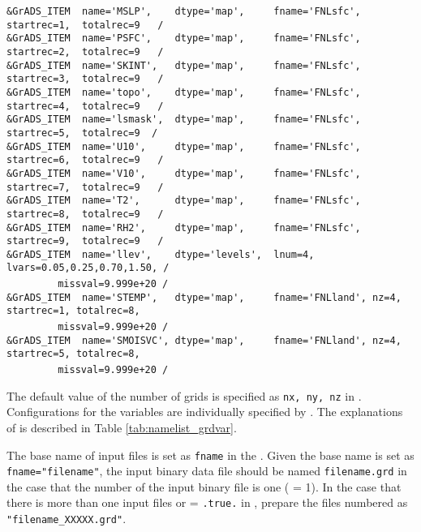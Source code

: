 {\verb|&GrADS_ITEM  name='MSLP',    dtype='map',     fname='FNLsfc', startrec=1,  totalrec=9   / |  \\
\verb|&GrADS_ITEM  name='PSFC',    dtype='map',     fname='FNLsfc', startrec=2,  totalrec=9   / |  \\
\verb|&GrADS_ITEM  name='SKINT',   dtype='map',     fname='FNLsfc', startrec=3,  totalrec=9   / |  \\
\verb|&GrADS_ITEM  name='topo',    dtype='map',     fname='FNLsfc', startrec=4,  totalrec=9   / |  \\
\verb|&GrADS_ITEM  name='lsmask',  dtype='map',     fname='FNLsfc', startrec=5,  totalrec=9  /  |  \\
\verb|&GrADS_ITEM  name='U10',     dtype='map',     fname='FNLsfc', startrec=6,  totalrec=9   / |  \\
\verb|&GrADS_ITEM  name='V10',     dtype='map',     fname='FNLsfc', startrec=7,  totalrec=9   / |  \\
\verb|&GrADS_ITEM  name='T2',      dtype='map',     fname='FNLsfc', startrec=8,  totalrec=9   / |  \\
\verb|&GrADS_ITEM  name='RH2',     dtype='map',     fname='FNLsfc', startrec=9,  totalrec=9   / |  \\
\verb|&GrADS_ITEM  name='llev',    dtype='levels',  lnum=4, lvars=0.05,0.25,0.70,1.50, /        |  \\
~~~~~~~~\verb| missval=9.999e+20 /|  \\
\verb|&GrADS_ITEM  name='STEMP',   dtype='map',     fname='FNLland', nz=4, startrec=1, totalrec=8,|\\
~~~~~~~~\verb| missval=9.999e+20 /|  \\
\verb|&GrADS_ITEM  name='SMOISVC', dtype='map',     fname='FNLland', nz=4, startrec=5, totalrec=8,|\\
~~~~~~~~\verb| missval=9.999e+20 /|  \\
}

The default value of the number of grids is specified as \verb|nx, ny, nz| in .
Configurations for the variables are individually specified by .
The explanations of  is described in Table \ref{tab:namelist_grdvar}.

The base name of input files is set as \verb|fname| in the .
Given the base name is set as \verb|fname="filename"|, the input binary data file should be named  \verb|filename.grd| in the case that the number of the input binary file is one ( = 1).
In the case that there is more than one input files or  = \verb|.true.| in , 
prepare the files numbered as \verb|"filename_XXXXX.grd"|.

